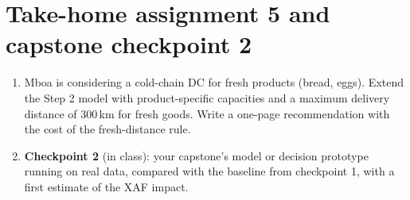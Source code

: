 \section{Take-home assignment 5 and capstone checkpoint 2}
\begin{enumerate}[nosep]
\item Mboa is considering a cold-chain DC for fresh products (bread, eggs). Extend the Step 2 model with product-specific
capacities and a maximum delivery distance of 300\,km for fresh goods. Write a one-page recommendation with the cost of
the fresh-distance rule.
\item \textbf{Checkpoint 2} (in class): your capstone's model or decision prototype running on real data, compared with
the baseline from checkpoint 1, with a first estimate of the XAF impact.
\end{enumerate}
